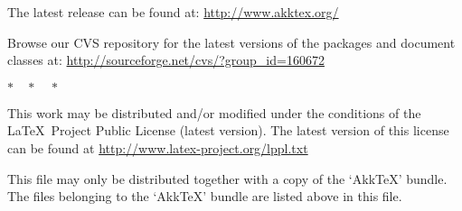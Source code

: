 \documentclass[DIV=9, pagesize=auto]{scrartcl}
\makeatletter
\newcommand*{\AkkTeX}{Akk\kern-0.09em\TeX\@\xspace}
\def\AkkTeX{AkkTeX\xspace}%
\makeatother
\begin{document}
The latest release can be found at:
\url{http://www.akktex.org/}
     
Browse our CVS repository for the latest versions of the packages and document
classes at:
\url{http://sourceforge.net/cvs/?group_id=160672}

\bigskip
\noindent\null\hfill$*\quad*\quad*\quad$\hfill\null\par
\bigskip

\noindent
This work may be distributed and/or modified under the
conditions of the \LaTeX\ Project Public License (latest version).
The latest version of this license can be found at
\url{http://www.latex-project.org/lppl.txt}

This file may only be distributed together with a copy of the
`\AkkTeX' bundle.
The files belonging to the `\AkkTeX' bundle are listed above in this file.
\end{document}
